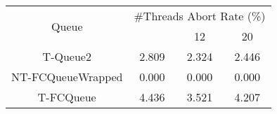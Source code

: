 \begin{tabular}{|c|c|c|c|}
\hline
\multirow{2}{*}{Queue} & \multicolumn{3}{c|}{\#Threads Abort Rate (\%)}\\\cline{2-4}& \quad 4 & 12 & 20\\
\hline
\hline
T-Queue2 & 2.809 & 2.324 & 2.446\\
NT-FCQueueWrapped & 0.000 & 0.000 & 0.000\\
T-FCQueue & 4.436 & 3.521 & 4.207\\
\hline\end{tabular}
